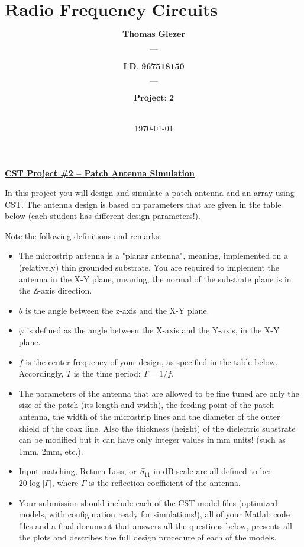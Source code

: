 \documentclass[12pt, letterpaper]{article}
\title{%
  \Large $\textbf{Radio Frequency Circuits \& Antenna}$
}
\author{
  $\textbf{Thomas Glezer}$\\\\
  $\textbf{---}$\\\\
  $\textbf{I.D. 967518150}$\\\\
  $\textbf{---}$\\\\
  $\textbf{Project: 2}$
  \\\\
}
\date{\today}
\begin{document}
\begin{titlingpage}
  \maketitle
\end{titlingpage}

\tableofcontents

\pagebreak

\begin{center}
  \underline{\textbf{CST Project \#2 – Patch Antenna Simulation}}
\end{center}

In this project you will design and simulate a patch antenna and an array using CST. The antenna design is based on parameters that are given in the table below (each student has different design parameters!).

Note the following definitions and remarks:

\begin{itemize}
  \item The microstrip antenna is a "planar antenna", meaning, implemented on a (relatively) thin grounded substrate. You are required to implement the antenna in the X-Y plane, meaning, the normal of the substrate plane is in the Z-axis direction.
  \item $\theta$ is the angle between the z-axis and the X-Y plane.
  \item $\varphi$ is defined as the angle between the X-axis and the Y-axis, in the X-Y plane.
  \item $f$ is the center frequency of your design, as specified in the table below. Accordingly, $T$ is the time period: $T=1/f$.
  \item The parameters of the antenna that are allowed to be fine tuned are only the size of the patch (its length and width), the feeding point of the patch antenna, the width of the microstrip lines and the diameter of the outer shield of the coax line. Also the thickness (height) of the dielectric substrate can be modified but it can have only integer values in mm units! (such as 1mm, 2mm, etc.).
  \item Input matching, Return Loss, or $S_{11}$ in dB scale are all defined to be: $20\log|\Gamma|$, where $\Gamma$ is the reflection coefficient of the antenna.
  \item Your submission should include each of the CST model files (optimized models, with configuration ready for simulations!), all of your Matlab code files and a final document that answers all the questions below, presents all the plots and describes the full design procedure of each of the models.
\end{itemize}
\end{document}
